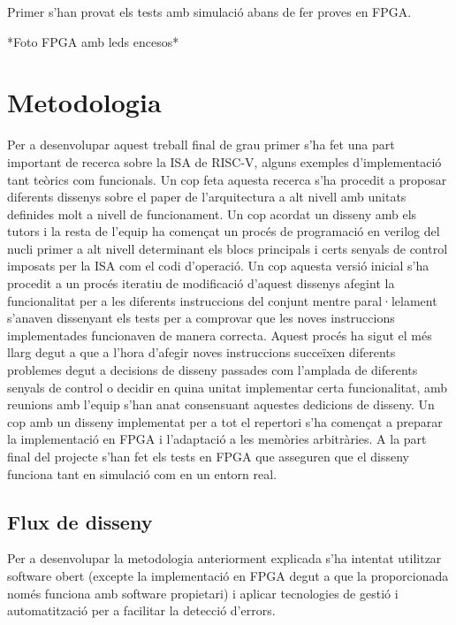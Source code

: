 \documentclass[10pt,a4paper,twocolumn,twoside]{article}
\begin{document}
    Primer s'han provat els tests amb simulació abans de fer proves en FPGA.
    
    *Foto FPGA amb leds encesos*


\section{Metodologia}

Per a desenvolupar aquest treball final de grau primer s'ha fet una part important de recerca sobre la ISA de RISC-V, alguns exemples d'implementació tant teòrics com funcionals. Un cop feta aquesta recerca s'ha procedit a proposar diferents dissenys sobre el paper de l'arquitectura a alt nivell amb unitats definides molt a nivell de funcionament. Un cop acordat un disseny amb els tutors i la resta de l'equip ha començat un procés de programació en verilog del nucli primer a alt nivell determinant els blocs principals i certs senyals de control imposats per la ISA com el codi d'operació. Un cop aquesta versió inicial s'ha procedit a un procés iteratiu de modificació d'aquest dissenys afegint la funcionalitat per a les diferents instruccions del conjunt mentre paral·lelament s'anaven dissenyant els tests per a comprovar que les noves instruccions implementades funcionaven de manera correcta. Aquest procés ha sigut el més llarg degut a que a l'hora d'afegir noves instruccions succeïxen diferents problemes degut a decisions de disseny passades com l'amplada de diferents senyals de control o decidir en quina unitat implementar certa funcionalitat, amb reunions amb l'equip s'han anat consensuant aquestes dedicions de disseny. Un cop amb un disseny implementat per a tot el repertori s'ha començat a preparar la implementació en FPGA i l'adaptació a les memòries arbitràries. A la part final del projecte s'han fet els tests en FPGA que asseguren que el disseny funciona tant en simulació com en un entorn real.


\subsection{Flux de disseny}  %
Per a desenvolupar la metodologia anteriorment explicada s'ha intentat utilitzar software obert (excepte la implementació en FPGA degut a que la proporcionada només funciona amb software propietari) i aplicar tecnologies de gestió i automatització per a facilitar la detecció d'errors. 
\end{document}
